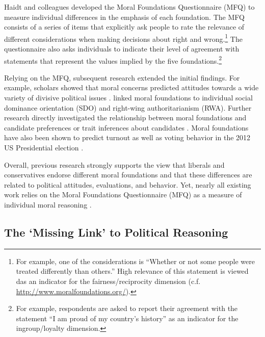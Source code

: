 \documentclass[12pt]{article}
\begin{document}
Haidt and colleagues developed the Moral Foundations Questionnaire (MFQ) to measure individual differences in the emphasis of each foundation. The MFQ consists of a series of items that explicitly ask people to rate the relevance of different considerations when making decisions about right and wrong.\footnote{For example, one of the considerations is ``Whether or not some people were treated differently than others.'' High relevance of this statement is viewed das an indicator for the fairness/reciprocity dimension (c.f. \url{http://www.moralfoundations.org/}).} The questionnaire also asks individuals to indicate their level of agreement with statements that represent the values implied by the five foundations.\footnote{For example, respondents are asked to report their agreement with the statement ``I am proud of my country’s history'' as an indicator for the ingroup/loyalty dimension.}

Relying on the MFQ, subsequent research extended the initial findings. For example, scholars showed that moral concerns predicted attitudes towards a wide variety of divisive political issues \citep[e.g.][]{koleva2012tracing,low2015moral}. \citet{federico2013mapping} linked moral foundations to individual social dominance orientation (SDO) and right-wing authoritarianism (RWA). Further research directly investigated the relationship between moral foundations and candidate preferences \citep{iyer2010beyond} or trait inferences about candidates \citep{clifford2014linking}. Moral foundations have also been shown to predict turnout \citep{johnson2014ideology} as well as voting behavior in the 2012 US Presidential election \citep{franks2015using}.

Overall, previous research strongly supports the view that liberals and conservatives endorse different moral foundations and that these differences are related to political attitudes, evaluations, and behavior. Yet, nearly all existing work relies on the Moral Foundations Questionnaire (MFQ) as a measure of individual moral reasoning \citep[but see][]{clifford2014linking}. 


\subsection{The `Missing Link' to Political Reasoning}
\end{document}
